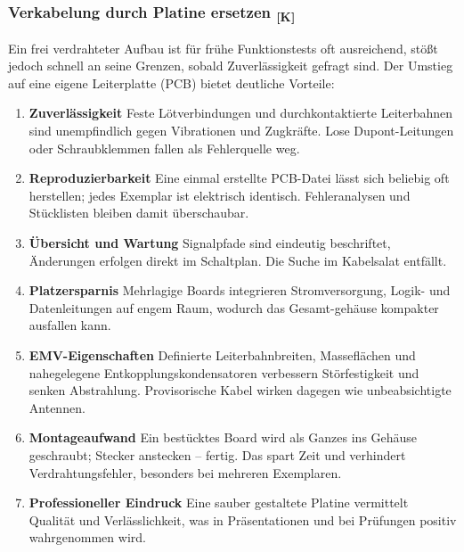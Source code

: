 \documentclass[a4paper,12pt]{article}
\begin{document}
\subsubsection{\texorpdfstring{Verkabelung durch Platine ersetzen \textsubscript{[K]}}{Verkabelung durch Platine ersetzen [K]}}

Ein frei verdrahteter Aufbau ist für frühe Funktionstests oft ausreichend, stößt jedoch
schnell an seine Grenzen, sobald Zuverlässigkeit gefragt sind. Der Umstieg auf eine eigene Leiterplatte (PCB) bietet deutliche Vorteile:

\begin{enumerate}
  \item \textbf{Zuverlässigkeit}  
        Feste Lötverbindungen und durchkontaktierte Leiterbahnen sind unempfindlich
        gegen Vibrationen und Zugkräfte. Lose Dupont-Leitungen oder Schraubklemmen
        fallen als Fehlerquelle weg.

  \item \textbf{Reproduzierbarkeit}  
        Eine einmal erstellte PCB-Datei lässt sich beliebig oft herstellen; jedes
        Exemplar ist elektrisch identisch. Fehleranalysen und Stücklisten bleiben
        damit überschaubar.

  \item \textbf{Übersicht und Wartung}  
        Signalpfade sind eindeutig beschriftet, Änderungen erfolgen direkt im
        Schaltplan. Die Suche im Kabelsalat entfällt.

  \item \textbf{Platzersparnis}  
        Mehrlagige Boards integrieren Stromversorgung, Logik- und Datenleitungen
        auf engem Raum, wodurch das Gesamt-gehäuse kompakter ausfallen kann.

  \item \textbf{EMV-Eigenschaften}  
        Definierte Leiterbahnbreiten, Masseflächen und nahegelegene
        Entkopplungskondensatoren verbessern Störfestigkeit und senken
        Abstrahlung. Provisorische Kabel wirken dagegen wie unbeabsichtigte
        Antennen.

  \item \textbf{Montageaufwand}  
        Ein bestücktes Board wird als Ganzes ins Gehäuse geschraubt; Stecker
        anstecken – fertig. Das spart Zeit und verhindert Verdrahtungsfehler,
        besonders bei mehreren Exemplaren.

  \item \textbf{Professioneller Eindruck}  
        Eine sauber gestaltete Platine vermittelt Qualität und Verlässlichkeit,
        was in Präsentationen und bei Prüfungen positiv wahrgenommen wird.
\end{enumerate}
\end{document}
